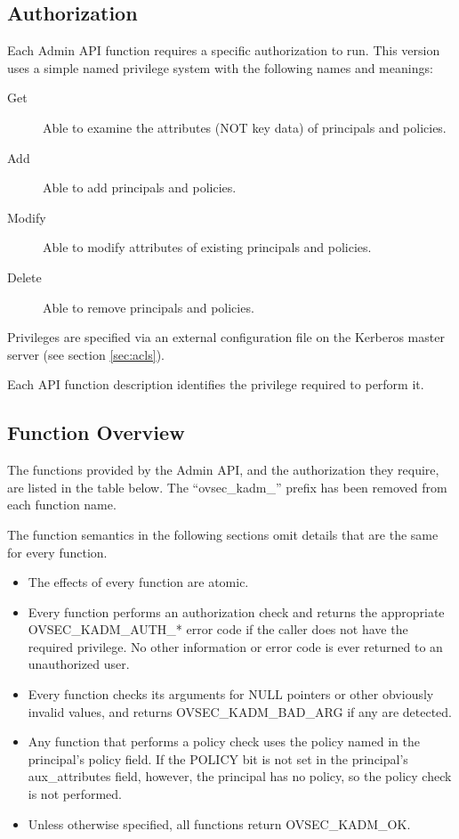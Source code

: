 \subsection{Authorization}

Each Admin API function requires a specific authorization to run.
This version uses a simple named privilege system with the following
names and meanings:

\begin{description}
\item[Get] Able to examine the attributes (NOT key data) of principals
and policies. 
\item[Add] Able to add principals and policies.
\item[Modify] Able to modify attributes of existing principals and policies.
\item[Delete] Able to remove principals and policies.
\end{description}

Privileges are specified via an external configuration file on the
Kerberos master server (see section \ref{sec:acls}).

Each API function description identifies the privilege required to
perform it.

\subsection{Function Overview}

The functions provided by the Admin API, and the authorization they
require, are listed in the table below.  The ``ovsec_kadm_'' prefix
has been removed from each function name.

The function semantics in the following sections omit details that are
the same for every function.

\begin{itemize}
\item The effects of every function are atomic.

\item Every function performs an authorization check and returns
the appropriate OVSEC_KADM_AUTH_* error code if the caller does not
have the required privilege.  No other information or error code is
ever returned to an unauthorized user.

\item Every function checks its arguments for NULL pointers or other
obviously invalid values, and returns OVSEC_KADM_BAD_ARG if any are
detected.

\item Any function that performs a policy check uses the policy named
in the principal's policy field.  If the POLICY bit is not set in the
principal's aux_attributes field, however, the principal has no
policy, so the policy check is not performed.

\item Unless otherwise specified, all functions return OVSEC_KADM_OK.
\end{itemize}

